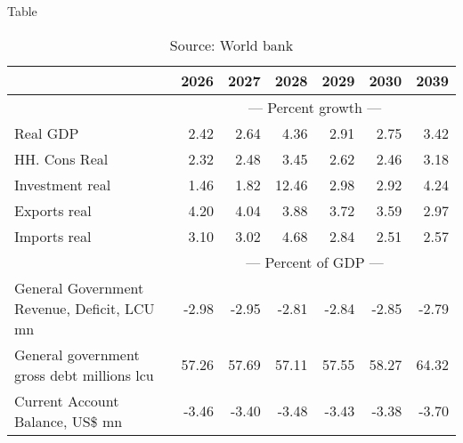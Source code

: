 \documentclass{article}
\begin{document}
\begin{table}[ht]
\caption{Table}
\begin{tabular}{lrrrrr|r}
\toprule
 & 2026 & 2027 & 2028 & 2029 & 2030 & 2039 \\
\midrule
&\multicolumn{6}{c}{{--- Percent growth ---}}                               \\
Real GDP & 2.42 & 2.64 & 4.36 & 2.91 & 2.75 & 3.42 \\
HH. Cons Real & 2.32 & 2.48 & 3.45 & 2.62 & 2.46 & 3.18 \\
Investment real & 1.46 & 1.82 & 12.46 & 2.98 & 2.92 & 4.24 \\
Exports real & 4.20 & 4.04 & 3.88 & 3.72 & 3.59 & 2.97 \\
Imports real & 3.10 & 3.02 & 4.68 & 2.84 & 2.51 & 2.57 \\
&\multicolumn{6}{c}{{--- Percent of GDP ---}}                               \\
General Government Revenue, Deficit, LCU mn & -2.98 & -2.95 & -2.81 & -2.84 & -2.85 & -2.79 \\
General government gross debt millions lcu & 57.26 & 57.69 & 57.11 & 57.55 & 58.27 & 64.32 \\
Current Account Balance, US\$ mn & -3.46 & -3.40 & -3.48 & -3.43 & -3.38 & -3.70 \\
\bottomrule
\end{tabular}
\caption*{Source: World bank }
\end{table}
\end{document}
